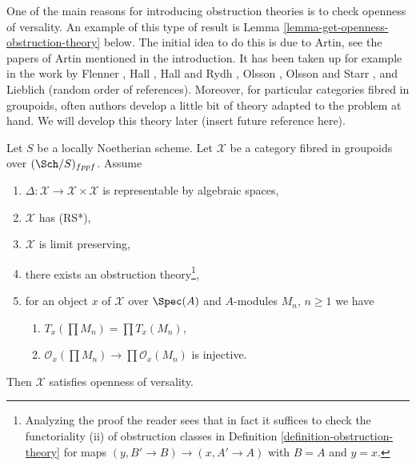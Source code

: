 \medskip\noindent
One of the main reasons for introducing obstruction theories is to check
openness of versality. An example of this type of result is
Lemma \ref{lemma-get-openness-obstruction-theory} below.
The initial idea to do this is due to Artin, see
the papers of Artin mentioned in the introduction. It has been taken up
for example in the work by Flenner \cite{Flenner},
Hall \cite{Hall-coherent},
Hall and Rydh \cite{rydh_axioms},
Olsson \cite{olsson_deformation},
Olsson and Starr \cite{olsson-starr}, and
Lieblich \cite{lieblich-complexes} (random order of references).
Moreover, for particular categories fibred in groupoids, often
authors develop a little bit of theory adapted to the problem at hand.
We will develop this theory later (insert future reference here).

\begin{lemma}
\label{lemma-get-openness-obstruction-theory}
Let $S$ be a locally Noetherian scheme. Let $\mathcal{X}$ be a category fibred
in groupoids over $(\Sch/S)_{fppf}$. Assume
\begin{enumerate}
\item $\Delta : \mathcal{X} \to \mathcal{X} \times \mathcal{X}$ is
representable by algebraic spaces,
\item $\mathcal{X}$ has (RS*),
\item $\mathcal{X}$ is limit preserving,
\item there exists an obstruction theory\footnote{Analyzing the proof
the reader sees that in fact it suffices to check
the functoriality (ii) of obstruction classes in
Definition \ref{definition-obstruction-theory}
for maps $(y, B' \to B) \to (x, A' \to A)$
with $B = A$ and $y = x$.},
\item for an object $x$ of $\mathcal{X}$ over $\Spec(A)$
and $A$-modules $M_n$, $n \geq 1$ we have
\begin{enumerate}
\item $T_x(\prod M_n) = \prod T_x(M_n)$,
\item $\mathcal{O}_x(\prod M_n) \to \prod \mathcal{O}_x(M_n)$
is injective.
\end{enumerate}
\end{enumerate}
Then $\mathcal{X}$ satisfies openness of versality.
\end{lemma}


